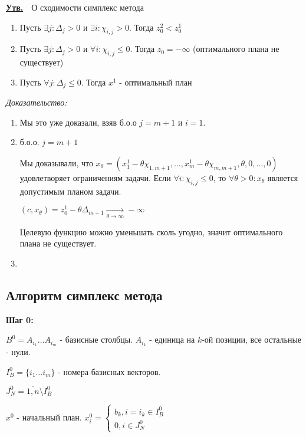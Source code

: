 \documentclass[11pt]{article}
\newenvironment{proof}{
  \textit{Доказательство:}
    
  \begin{adjustwidth}{1em}{}
}{
  \end{adjustwidth}
}
\newenvironment{statement}{
  \underline{\textbf{Утв.}}\ \ }{
  
}
\begin{document}
\begin{sloppypar}
\begin{statement}{О сходимости симплекс метода}
  \begin{enumerate}
    \item Пусть $\exists j: \Delta_j > 0$ и $\exists i: \chi_{i, j} > 0$. Тогда $z^2_0 < z^1_0$
    \item Пусть $\exists j: \Delta_j > 0$ и $\forall i: \chi_{i, j} \leq 0$. Тогда $z_0 = - \infty$ (оптимального плана не существует) %
    \item Пусть $\forall j: \Delta_j \leq 0$. Тогда $x^1$ - оптимальный план
  \end{enumerate}
\end{statement}
\begin{proof}
  \begin{enumerate}
    \item Мы это уже доказали, взяв б.о.о $j = m + 1$ и $i = 1$.
    \item б.о.о. $j = m + 1$
      
      Мы доказывали, что $x_\theta = (x^1_1 - \theta \chi_{1, m+1}, \dots, x^1_m - \theta \chi_{m, m+1}, \theta, 0, \dots, 0)$ удовлетворяет ограничениям задачи. Если $\forall i: \chi_{i, j} \leq 0$, то $\forall \theta > 0: x_\theta$ является допустимым планом задачи.
      
      $(c, x_\theta) = z^1_0 - \theta \Delta_{m+1} \xrightarrow[\theta \to \infty]{} - \infty$
      
      Целевую функцию можно уменьшать сколь угодно, значит оптимального плана не существует.
    \item
  \end{enumerate}
\end{proof}

\subsection*{Алгоритм симплекс метода}
\textbf{Шаг 0:}

$B^0 = A_{i_1} \dots A_{i_m}$ - базисные столбцы. $A_{i_k}$ - единица на $k$-ой позиции, все остальные - нули.

$I^0_B = \{i_1 \dots i_m\}$ - номера базисных векторов.

$J^0_N = \overline{1, n} \setminus I^0_B$

$x^0$ - начальный план. $x^0_i = \begin{cases}
  b_k, i = i_k \in I^0_B \\
  0, i \in J^0_N
\end{cases}$


\end{sloppypar}
\end{document}
